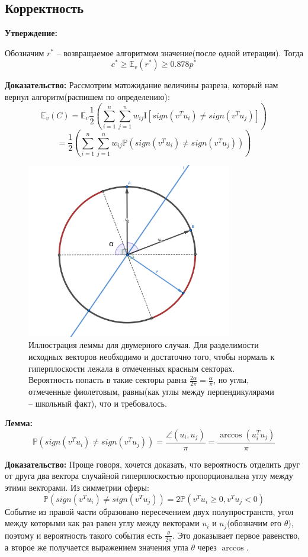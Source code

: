 \documentclass[12pt, a4paper]{article}
\newcommand{\Expect}{\mathbb{E}}
\begin{document}
\subsection{Корректность}
\textbf{Утверждение:}

Обозначим $r^*$ -- возвращаемое алгоритмом значение(после одной итерации). Тогда
$$ c^* \geqslant \Expect_v (r^*) \geqslant 0.878 p^*$$

\textbf{Доказательство:}
Рассмотрим матожидание величины разреза, который нам вернул алгоритм(распишем по определению):
$$ \Expect_v (C) = \Expect_v \frac{1}{2} \left( \sum_{i = 1}^{n} \sum_{j=1}^{n} w_{ij} \mathrm{I}[sign(v^Tu_i) \ne sign(v^Tu_j)] \right)$$
$$ = \frac{1}{2} \left( \sum_{i = 1}^{n} \sum_{j=1}^{n} w_{ij} \mathbb{P}(sign(v^Tu_i) \ne sign(v^Tu_j)) \right)$$

\begin{figure}[h]
\centering
\includegraphics[width=0.8\textwidth]{images/Lemma.png}
\caption[width=0.8\textwidth]{Иллюстрация леммы для двумерного случая. Для разделимости исходных векторов необходимо и достаточно того, чтобы нормаль к гиперплоскости лежала в отмеченных красным секторах. Вероятность попасть в такие секторы равна $\frac{2\alpha}{2\pi} = \frac{\alpha}{\pi}$, но углы, отмеченные фиолетовым, равны(как углы между перпендикулярами -- школьный факт), что и требовалось.}
\label{fig:fig2}
\end{figure}

\textbf{Лемма:}
$$\mathbb{P}(sign(v^Tu_i) \ne sign(v^Tu_j)) = \frac{\angle (u_i, u_j)}{\pi} = \frac{\arccos(u_i^T u_j)}{\pi}$$

\textbf{Доказательство:}
Проще говоря, хочется доказать, что вероятность отделить друг от друга два вектора случайной гиперплоскостью пропорциональна углу между этими векторами. Из симметрии сферы:
$$\mathbb{P}(sign(v^Tu_i) \ne sign(v^Tu_j)) = 2\mathbb{P}(v^Tu_i \geqslant 0, v^Tu_j < 0)$$
Событие из правой части образовано пересечением двух полупространств, угол между которыми как раз равен углу между векторами $u_i$ и $u_j$(обозначим его $\theta$), поэтому и вероятность такого события есть $\frac{\theta}{2\pi}$. Это доказывает первое равенство, а второе же получается выражением значения угла $\theta$ через $\arccos$. \\
\null \hfill \square
\end{document}
